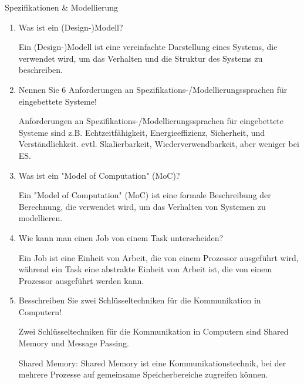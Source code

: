 \documentclass{article}
\begin{document}
\begin{exercise}{Spezifikationen \& Modellierung}
  \begin{enumerate}
    \item Was ist ein (Design-)Modell?

          \begin{solution}
            Ein (Design-)Modell ist eine vereinfachte Darstellung eines Systems, die verwendet wird, um das Verhalten und die Struktur des Systems zu beschreiben.
          \end{solution}

    \item Nennen Sie 6 Anforderungen an Spezifikations-/Modellierungssprachen für eingebettete Systeme!

          \begin{solution}
            Anforderungen an Spezifikations-/Modellierungssprachen für eingebettete Systeme sind z.B. Echtzeitfähigkeit, Energieeffizienz, Sicherheit, und Verständlichkeit. evtl. Skalierbarkeit, Wiederverwendbarkeit, aber weniger bei ES.
          \end{solution}

    \item Was ist ein "Model of Computation" (MoC)?

          \begin{solution}
            Ein "Model of Computation" (MoC) ist eine formale Beschreibung der Berechnung, die verwendet wird, um das Verhalten von Systemen zu modellieren.
          \end{solution}

    \item Wie kann man einen Job von einem Task unterscheiden?

          \begin{solution}
            Ein Job ist eine Einheit von Arbeit, die von einem Prozessor ausgeführt wird, während ein Task eine abstrakte Einheit von Arbeit ist, die von einem Prozessor ausgeführt werden kann.
          \end{solution}

    \item Besschreiben Sie zwei Schlüsseltechniken für die Kommunikation in Computern!

          \begin{solution}
            Zwei Schlüsseltechniken für die Kommunikation in Computern sind Shared Memory und Message Passing.

            Shared Memory: Shared Memory ist eine Kommunikationstechnik, bei der mehrere Prozesse auf gemeinsame Speicherbereiche zugreifen können.


\end{solution}
\end{enumerate}
\end{exercise}
\end{document}
